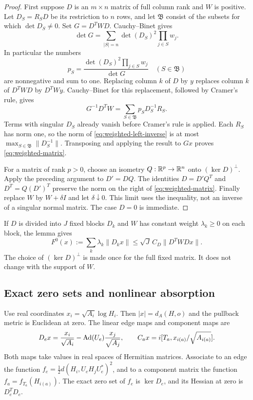 \begin{proof}
First suppose $D$ is an $m\times n$ matrix of full column rank and
$W$ is positive. Let $D_S=R_SD$ be its restriction to $n$ rows, and
let $\mathfrak B$ consist of the subsets for which $\det D_S\ne0$.
Set $G=D^TWD$. Cauchy--Binet gives
\[
 \det G=\sum_{|S|=n}\det(D_S)^2\prod_{j\in S}w_j.
\]
In particular the numbers
\[
 p_S=\frac{\det(D_S)^2\prod_{j\in S}w_j}{\det G}
 \quad(S\in\mathfrak B)
\]
are nonnegative and sum to one. Replacing column $k$ of $D$ by $y$
replaces column $k$ of $D^TWD$ by $D^TWy$. Cauchy--Binet for this
replacement, followed by Cramer's rule, gives
\begin{equation}\label{eq:weighted-left-inverse}
 G^{-1}D^TW=\sum_{S\in\mathfrak B}p_S D_S^{-1}R_S.
\end{equation}
Terms with singular $D_S$ already vanish before Cramer's rule is
applied. Each $R_S$ has norm one, so the norm of
\eqref{eq:weighted-left-inverse} is at most
$\max_{S\in\mathfrak B}\|D_S^{-1}\|$. Transposing and applying
the result to $Gx$ proves \eqref{eq:weighted-matrix}.

For a matrix of rank $p>0$, choose an isometry $Q:\mathbb R^p\to\mathbb R^n$
onto $(\ker D)^\perp$. Apply the preceding argument to $D'=DQ$.
The identities $D=D'Q^T$ and $D^T=Q(D')^T$ preserve the norm on
the right of \eqref{eq:weighted-matrix}. Finally replace $W$ by
$W+\delta I$ and let $\delta\downarrow0$. This limit uses the
inequality, not an inverse of a singular normal matrix. The case $D=0$
is immediate.
\end{proof}

If $D$ is divided into $J$ fixed blocks $D_k$ and $W$ has constant
weight $\lambda_k\ge0$ on each block, the lemma gives
\begin{equation}\label{eq:linear-force}
 F^0(x):=\sum_k\lambda_k\|D_kx\|
 \le\sqrt J\,C_D\|D^TWDx\|.
\end{equation}
The choice of $(\ker D)^\perp$ is made once for the full fixed
matrix. It does not change with the support of $W$.

\subsection{Exact zero sets and nonlinear absorption}
Use real coordinates $x_i=\sqrt{A_i}\log H_i$. Then
$|x|=d_A(H,o)$ and the pullback metric is Euclidean at zero. The
linear edge maps and component maps are
\[
 D_ex=\frac{x_i}{\sqrt{A_i}}-
       \operatorname{Ad}(U_e)\frac{x_j}{\sqrt{A_j}},
 \qquad
 C_ax=i[T_a,x_{i(a)}/\sqrt{A_{i(a)}}].
\]
Both maps take values in real spaces of Hermitian matrices. Associate
to an edge the function $f_e=\frac12d(H_i,U_eH_jU_e^*)^2$, and
to a component matrix the function $f_a=f_{T_a}(H_{i(a)})$.
The exact zero set of $f_e$ is $\ker D_e$, and its Hessian at zero
is $D_e^TD_e$.

